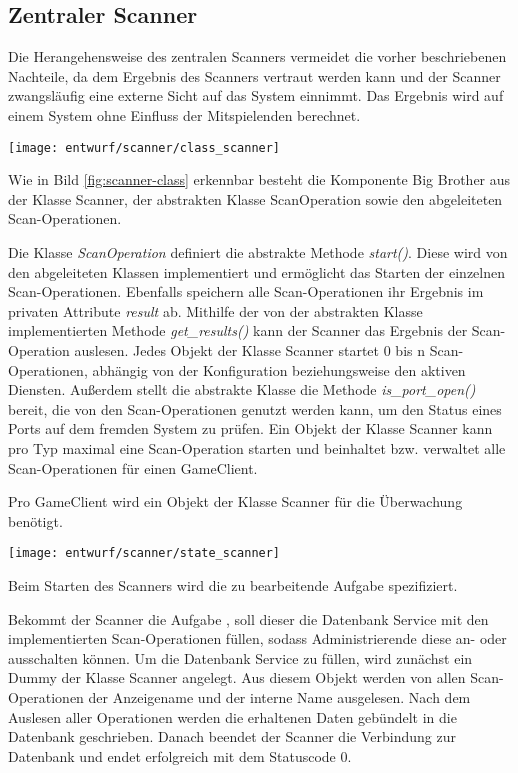 \subsection{Zentraler Scanner}
Die Herangehensweise des zentralen Scanners vermeidet die vorher beschriebenen Nachteile, da dem Ergebnis des Scanners vertraut werden kann und der Scanner zwangsläufig eine externe Sicht auf das System einnimmt. Das Ergebnis wird auf einem System ohne Einfluss der Mitspielenden berechnet.

\begin{center}
	\texttt{[image: entwurf/scanner/class\_scanner]}
	\label{fig:scanner-class}
\end{center}

Wie in Bild \ref{fig:scanner-class} erkennbar besteht die Komponente Big Brother aus der Klasse Scanner, der abstrakten Klasse ScanOperation sowie den abgeleiteten Scan-Operationen.

Die Klasse \textit{ScanOperation} definiert die abstrakte Methode \textit{start()}. Diese wird von den abgeleiteten Klassen implementiert und ermöglicht das Starten der einzelnen Scan-Operationen. Ebenfalls speichern alle Scan-Operationen ihr Ergebnis im privaten Attribute \textit{result} ab. Mithilfe der von der abstrakten Klasse implementierten Methode \textit{get\_results()} kann der Scanner das Ergebnis der Scan-Operation auslesen. Jedes Objekt der Klasse Scanner startet 0 bis n Scan-Operationen, abhängig von der Konfiguration beziehungsweise den aktiven Diensten. Außerdem stellt die abstrakte Klasse die Methode \textit{is\_port\_open()} bereit, die von den Scan-Operationen genutzt werden kann, um den Status eines Ports auf dem fremden System zu prüfen. Ein Objekt der Klasse Scanner kann pro Typ maximal eine Scan-Operation starten und beinhaltet bzw. verwaltet alle Scan-Operationen für einen GameClient. 

Pro GameClient wird ein Objekt der Klasse Scanner für die Überwachung benötigt.

\begin{center}
	\texttt{[image: entwurf/scanner/state\_scanner]}
	\label{fig:scanner-state}
\end{center}

Beim Starten des Scanners wird die zu bearbeitende Aufgabe spezifiziert.

Bekommt der Scanner die Aufgabe , soll dieser die Datenbank Service mit den implementierten Scan-Operationen füllen, sodass Administrierende diese an- oder ausschalten können. Um die Datenbank Service zu füllen, wird zunächst ein Dummy der Klasse Scanner angelegt. Aus diesem Objekt werden von allen Scan-Operationen der Anzeigename und der interne Name ausgelesen. Nach dem Auslesen aller Operationen werden die erhaltenen Daten gebündelt in die Datenbank geschrieben. Danach beendet der Scanner die Verbindung zur Datenbank und endet erfolgreich mit dem Statuscode 0.

